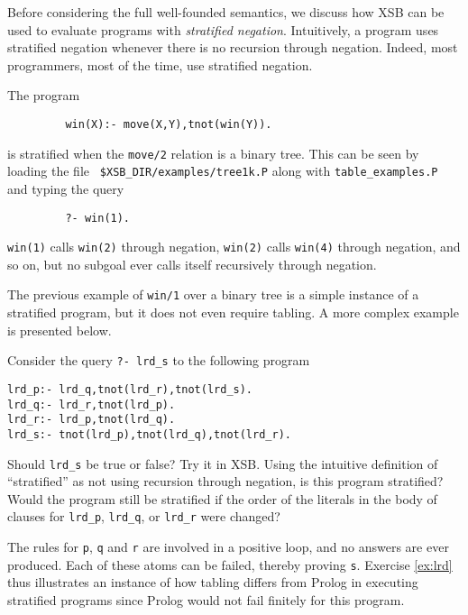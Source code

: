 Before considering the full well-founded semantics, we discuss how XSB
can be used to evaluate programs with {\em stratified negation}.
Intuitively, a program uses stratified negation whenever there is no
recursion through negation.  Indeed, most programmers, most of the
time, use stratified negation.  

\begin{exercise} \label{ex:win1}
The program
\begin{verbatim}
         win(X):- move(X,Y),tnot(win(Y)).
\end{verbatim}
is stratified when the {\tt move/2} relation is a binary tree.  This
can be seen by loading the file {\tt
\verb|$XSB_DIR/examples/|tree1k.P} along with {\tt table\_examples.P}
and typing the query
\begin{verbatim}
         ?- win(1).
\end{verbatim}
{\tt win(1)} calls {\tt win(2)} through negation, {\tt win(2)} calls
{\tt win(4)} through negation, and so on, but no subgoal ever calls
itself recursively through negation.
\end{exercise}

The previous example of {\tt win/1} over a binary tree is a simple
instance of a stratified program, but it does not even require
tabling.  A more complex example is presented below.

\begin{exercise} \label{ex:lrd}
Consider the query {\tt ?- lrd\_s} to the following program
\begin{verbatim}
lrd_p:- lrd_q,tnot(lrd_r),tnot(lrd_s).
lrd_q:- lrd_r,tnot(lrd_p).
lrd_r:- lrd_p,tnot(lrd_q).
lrd_s:- tnot(lrd_p),tnot(lrd_q),tnot(lrd_r). 
\end{verbatim}
Should {\tt lrd\_s} be true or false?  Try it in XSB.  Using the
intuitive definition of ``stratified'' as not using recursion through
negation, is this program stratified?  Would the program still be
stratified if the order of the literals in the body of clauses for
{\tt lrd\_p}, {\tt lrd\_q}, or {\tt lrd\_r} were changed?
\end{exercise}

The rules for {\tt p}, {\tt q} and {\tt r} are involved in a positive
loop, and no answers are ever produced.  Each of these atoms can be
failed, thereby proving {\tt s}.  Exercise \ref{ex:lrd} thus
illustrates an instance of how tabling differs from Prolog in
executing stratified programs since Prolog would not fail finitely for
this program.

